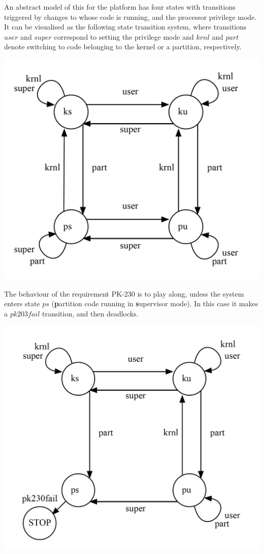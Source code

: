 An abstract model of this for the platform
has four states with transitions triggered
by changes to whose code is running, and the processor privilege mode.
It can be visualised as the following state transition system,
where transitions $user$ and $super$ correspond to setting the privilege mode
and $krnl$ and $part$ denote switching to code belonging to the kernel or
a partition, respectively.

\includegraphics[scale=0.35]{images/CodeModelLTS}

The behaviour of the requirement PK-230 is to play along,
unless the system enters state $ps$
(\textbf{p}artition code running in \textbf{s}upervisor mode).
In this case it makes a $pk203fail$ transition, and then deadlocks.

\includegraphics[scale=0.35]{images/PK230LTS}

